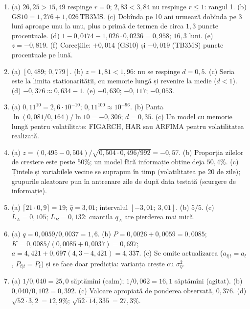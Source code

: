 \documentclass[10.5pt]{article}
\begin{document}
{\begin{enumerate}[label=\textbf{\arabic*.},leftmargin=2.2em,itemsep=0.25ex]
statistica este deplasată spre valori negative; sînt necesare valorile critice Engle--Granger.
\item (a) $26{,}25>15{,}49$ respinge $r=0$; $2{,}83<3{,}84$ nu respinge $r\le 1$: rangul 1. (b)
$\mathrm{GS10}=1{,}276+1{,}026\,\mathrm{TB3MS}$. (c) Dobînda pe 10 ani urmează dobînda pe 3 luni aproape unu la unu, plus o
primă de termen de circa $1{,}3$ puncte procentuale. (d) $1-0{,}0174-1{,}026\cdot 0{,}0236=0{,}958$; $16{,}3$ luni. (e) $z=-0{,}819$. (f) Corecțiile: $+0{,}014$ (GS10) și $-0{,}019$ (TB3MS) puncte procentuale pe lună.
\item (a) $[0{,}489;\ 0{,}779]$. (b) $z=1{,}81<1{,}96$: nu se respinge $d=0{,}5$. (c) Seria este la limita staționarității, cu memorie lungă și revenire la medie ($d<1$). (d) $-0{,}376\approx 0{,}634-1$. (e) $-0{,}630$;
$-0{,}117$; $-0{,}053$.
\item (a) $0{,}11^{10}=2{,}6\cdot 10^{-10}$; $0{,}11^{100}\approx 10^{-96}$. (b) Panta $\ln(0{,}081/0{,}164)/\ln 10=-0{,}306$;
$d=0{,}35$. (c) Un model cu memorie lungă pentru volatilitate: FIGARCH, HAR sau ARFIMA pentru volatilitatea realizată.
\item (a) $z=(0{,}495-0{,}504)/\sqrt{0{,}504\cdot 0{,}496/992}=-0{,}57$. (b) Proporția zilelor de creștere este peste
50\%; un model fără informație obține deja $50{,}4\%$. (c) Țintele și variabilele vecine se suprapun în timp (volatilitatea
pe 20 de zile); grupurile aleatoare pun în antrenare zile de după data testată (scurgere de informație).
\item (a) $\lceil 21\cdot 0{,}9\rceil=19$; $\hat q=3{,}01$; intervalul $[-3{,}01;\ 3{,}01]$. (b) $5/5$. (c) $L_A=0{,}105$;
$L_B=0{,}132$: cuantila $q_A$ are pierderea mai mică.
\item (a) $q=0{,}0059/0{,}0037=1{,}6$. (b) $P=0{,}0026+0{,}0059=0{,}0085$; $K=0{,}0085/(0{,}0085+0{,}0037)=0{,}697$;
$a=4{,}421+0{,}697(4{,}3-4{,}421)=4{,}337$. (c) Se omite actualizarea ($a_{t|t}=a_t$, $P_{t|t}=P_t$) și se face doar
predicția: varianța crește cu $\sigma^2_\eta$.
\item (a) $1/0{,}040=25{,}0$ săptămîni (calm); $1/0{,}062=16{,}1$ săptămîni (agitat). (b) $0{,}040/0{,}102=0{,}392$. (c) Valoare apropiată de ponderea observată, $0{,}376$. (d) $\sqrt{52\cdot 3{,}2}=12{,}9\%$; $\sqrt{52\cdot 14{,}335}=27{,}3\%$.
\end{enumerate}}
\end{document}
